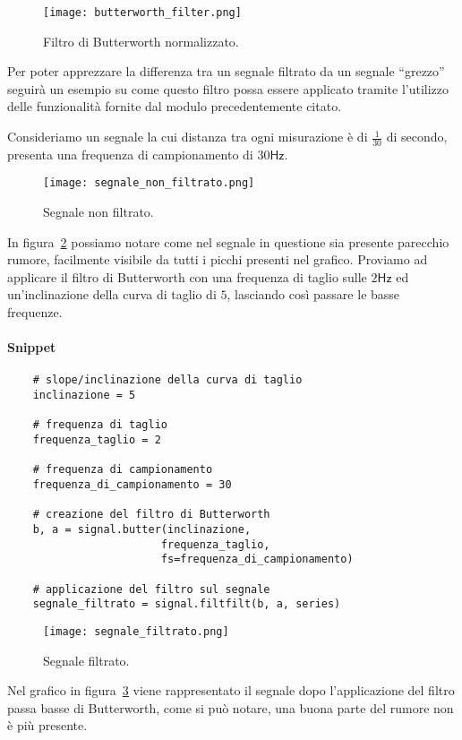 \begin{figure}[H]
    \centering
    \texttt{[image: butterworth\_filter.png]}
    \caption{Filtro di Butterworth normalizzato.}
    \label{fig:butterworth_filter}
\end{figure}

Per poter apprezzare la differenza tra un segnale filtrato da un segnale ``grezzo''
seguirà un esempio su come questo filtro possa essere applicato tramite l'utilizzo
delle funzionalità fornite dal modulo precedentemente citato.

\begin{esempio} 
Consideriamo un segnale la cui distanza tra ogni misurazione è di $\frac{1}{30}$
di secondo, presenta una frequenza di campionamento di $30\mathsf{Hz}$.

\begin{figure}[H]
    \centering
    \texttt{[image: segnale\_non\_filtrato.png]}
    \caption{Segnale non filtrato.}
    \label{fig:segnale_non_filtrato}
\end{figure}

In figura~\ref*{fig:segnale_non_filtrato} possiamo notare come nel segnale
in questione sia presente parecchio rumore, facilmente visibile da tutti i picchi 
presenti nel grafico. Proviamo ad applicare il filtro di Butterworth con una frequenza
di taglio sulle $2\mathsf{Hz}$ ed un'inclinazione della curva di taglio di $5$, lasciando
così passare le basse frequenze.


\paragraph{Snippet}
\begin{verbatim}
    # slope/inclinazione della curva di taglio
    inclinazione = 5 

    # frequenza di taglio
    frequenza_taglio = 2

    # frequenza di campionamento
    frequenza_di_campionamento = 30

    # creazione del filtro di Butterworth
    b, a = signal.butter(inclinazione, 
                        frequenza_taglio, 
                        fs=frequenza_di_campionamento)

    # applicazione del filtro sul segnale
    segnale_filtrato = signal.filtfilt(b, a, series)
\end{verbatim}

\begin{figure}[H]
    \centering
    \texttt{[image: segnale\_filtrato.png]}
    \caption{Segnale filtrato.}
    \label{fig:segnale_filtrato}
\end{figure}

Nel grafico in figura~\ref*{fig:segnale_filtrato} viene rappresentato il segnale dopo l'applicazione
del filtro passa basse di Butterworth, come si può notare, una buona parte del rumore
non è più presente.

\end{esempio}


